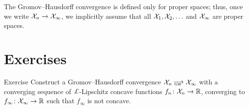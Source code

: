 The Gromov--Hausdorff convergence is defined only for proper spaces;
thus, once we write $\mathcal{X}_n\xrightarrow{}\mathcal{X}_\infty$, 
we implicitly assume that all $\spc{X}_1,\spc{X}_2,\dots$ and $\mathcal{X}_\infty$ are proper spaces.

\section{Exercises}

\begin{thm}{Exercise} Construct a Gromov--Hausdorff convergence 
$\spc{X}_n\GHto \spc{X}_\infty$ 
with a converging sequence of $\Lip$-Lipschitz concave functions $f_n\:\spc{X}_n\to\RR$, 
converging to $f_\infty\:\spc{X}_\infty\to \RR$ 
such that $f_\infty$ is not concave.
\end{thm}
